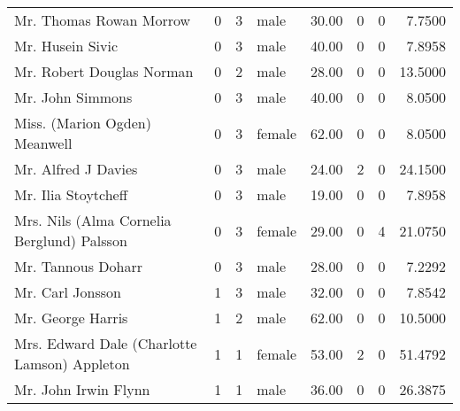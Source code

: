 \begin{tabular}{lrrlrrrr}
Mr. Thomas Rowan Morrow                            &         0 &       3 &    male &  30.00 &                        0 &                        0 &    7.7500 \\
Mr. Husein Sivic                                   &         0 &       3 &    male &  40.00 &                        0 &                        0 &    7.8958 \\
Mr. Robert Douglas Norman                          &         0 &       2 &    male &  28.00 &                        0 &                        0 &   13.5000 \\
Mr. John Simmons                                   &         0 &       3 &    male &  40.00 &                        0 &                        0 &    8.0500 \\
Miss. (Marion Ogden) Meanwell                      &         0 &       3 &  female &  62.00 &                        0 &                        0 &    8.0500 \\
Mr. Alfred J Davies                                &         0 &       3 &    male &  24.00 &                        2 &                        0 &   24.1500 \\
Mr. Ilia Stoytcheff                                &         0 &       3 &    male &  19.00 &                        0 &                        0 &    7.8958 \\
Mrs. Nils (Alma Cornelia Berglund) Palsson         &         0 &       3 &  female &  29.00 &                        0 &                        4 &   21.0750 \\
Mr. Tannous Doharr                                 &         0 &       3 &    male &  28.00 &                        0 &                        0 &    7.2292 \\
Mr. Carl Jonsson                                   &         1 &       3 &    male &  32.00 &                        0 &                        0 &    7.8542 \\
Mr. George Harris                                  &         1 &       2 &    male &  62.00 &                        0 &                        0 &   10.5000 \\
Mrs. Edward Dale (Charlotte Lamson) Appleton       &         1 &       1 &  female &  53.00 &                        2 &                        0 &   51.4792 \\
Mr. John Irwin Flynn                               &         1 &       1 &    male &  36.00 &                        0 &                        0 &   26.3875 \\

\end{tabular}
